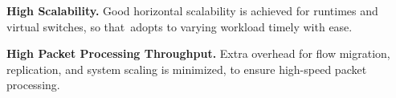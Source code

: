 
{\bf High Scalability.} Good horizontal scalability is achieved for runtimes and virtual switches, so that~\nfactor adopts to varying workload timely with ease.

{\bf High Packet Processing Throughput.} Extra overhead for flow migration, replication, and system scaling is minimized, to ensure high-speed packet processing.
